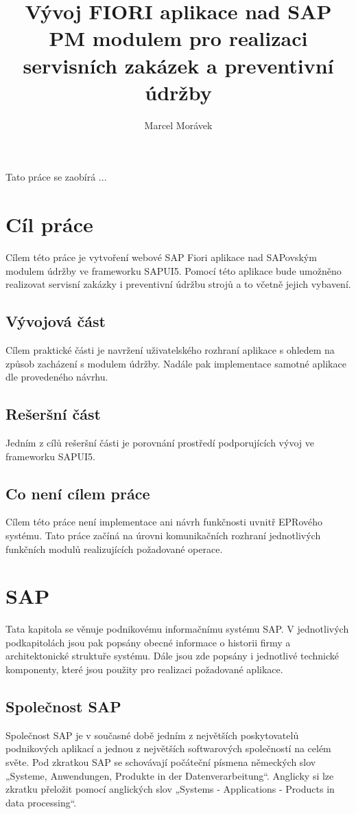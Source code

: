 \documentclass[thesis=M,czech]{FITthesis}[2012/06/26]
\title{Vývoj FIORI aplikace nad SAP PM modulem pro realizaci servisních zakázek a preventivní údržby}
\author{Marcel Morávek} %
\begin{document}

\begin{introduction}
	Tato práce se zaobírá ...
\end{introduction}

\chapter{Cíl práce}
Cílem této práce je vytvoření webové SAP Fiori aplikace nad SAPovským modulem údržby ve frameworku SAPUI5. Pomocí této aplikace bude umožněno realizovat servisní zakázky i preventivní údržbu strojů a to včetně jejich vybavení.

\section{Vývojová část}
Cílem praktické části je navržení uživatelského rozhraní aplikace s ohledem na způsob zacházení s modulem údržby. Nadále pak implementace samotné aplikace dle provedeného návrhu. 

\section{Rešeršní část}
Jedním z cílů rešeršní části je porovnání prostředí podporujících vývoj ve frameworku SAPUI5. 

\section{Co není cílem práce}
Cílem této práce není implementace ani návrh funkčnosti uvnitř EPRového systému. Tato práce začíná na úrovni komunikačních rozhraní jednotlivých funkčních modulů realizujících požadované operace. 






\chapter{SAP}
Tata kapitola se věnuje podnikovému informačnímu systému SAP. V jednotlivých podkapitolách jsou pak popsány obecné informace o historii firmy a architektonické struktuře systému. Dále jsou zde popsány i jednotlivé technické komponenty, které jsou použity pro realizaci požadované aplikace. 
\section{Společnost SAP}
Společnost SAP je v současné době jedním z největších poskytovatelů podnikových aplikací a jednou z největších softwarových společností na celém světe. 
Pod zkratkou SAP se schovávají počáteční písmena německých slov „Systeme, Anwendungen, Produkte in der Datenverarbeitung“. Anglicky si lze zkratku přeložit pomocí anglických slov „Systems - Applications - Products in data processing“.
\end{document}
